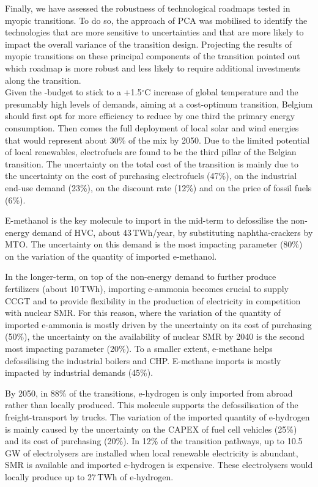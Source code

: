 Finally, we have assessed the robustness of technological roadmaps tested in myopic transitions. To do so, the approach of \acrfull{PCA} was mobilised to identify the technologies that are more sensitive to uncertainties and that are more likely to impact the overall variance of the transition design. Projecting the results of myopic transitions on these principal components of the transition pointed out which roadmap is more robust and less likely to require additional investments along the transition.\\

Given the -budget to stick to a +1.5$^{\circ}$C increase of global temperature and the presumably high levels of demands,  aiming at a cost-optimum transition, Belgium should first opt for more efficiency to reduce by one third the primary energy consumption. Then comes the full deployment of local solar and wind energies that would represent about 30\% of the mix by 2050. Due to the limited potential of local renewables, electrofuels are found to be the third pillar of the Belgian transition. The uncertainty on the total cost of the transition is mainly due to the uncertainty on the cost of purchasing electrofuels (47\%), on the industrial end-use demand (23\%), on the discount rate (12\%) and on the price of fossil fuels (6\%).

E-methanol is the key molecule to import in the mid-term to defossilise the non-energy demand of \acrfull{HVC}, about 43\,TWh/year, by substituting naphtha-crackers by \acrfull{MTO}. The uncertainty on this demand is the most impacting parameter (80\%) on the variation of the quantity of imported e-methanol. 

In the longer-term, on top of the non-energy demand to further produce fertilizers (about 10\,TWh), importing e-ammonia becomes crucial to supply \acrfull{CCGT} and to provide flexibility in the production of electricity in competition with nuclear \acrfull{SMR}. For this reason, where the variation of the quantity of imported e-ammonia is mostly driven by the uncertainty on its cost of purchasing (50\%), the uncertainty on the availability of nuclear \gls{SMR} by 2040 is the second most impacting parameter (20\%). To a smaller extent, e-methane helps defossilising the industrial boilers and \acrfull{CHP}. E-methane imports is mostly impacted by industrial demands (45\%). 

By 2050, in 88\% of the transitions, e-hydrogen is only imported from abroad rather than locally produced. This molecule supports the defossilisation of the freight-transport by trucks. The variation of the imported quantity of e-hydrogen is mainly caused by the uncertainty on the CAPEX of fuel cell vehicles (25\%) and its cost of purchasing (20\%). In 12\% of the transition pathways, up to 10.5\,GW of electrolysers are installed when local renewable electricity is abundant, \gls{SMR} is available and imported e-hydrogen is expensive. These electrolysers would locally produce up to 27\,TWh of e-hydrogen. 

